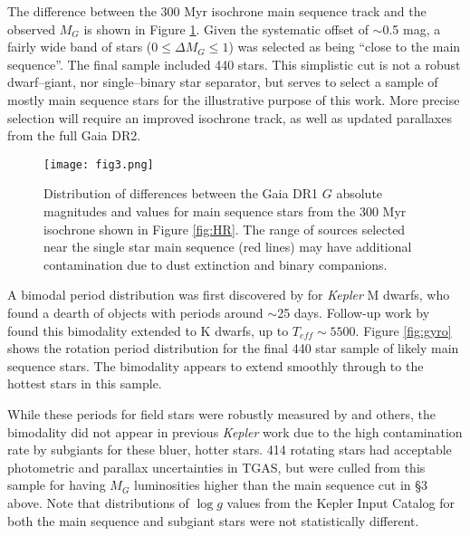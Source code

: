 \documentclass[manuscript, letterpaper]{aastex6}
\makeatletter
\let\origsection\section
\renewcommand\section{\@ifstar{\starsection}{\nostarsection}}
\newcommand\nostarsection[1]{\sectionprelude\origsection{#1}}
\newcommand\starsection[1]{\sectionprelude\origsection*{#1}}
\newcommand\sectionprelude{\vspace{1em}}
\newcommand{\Kepler}{\textsl{Kepler}\xspace}
\makeatother
\begin{document}
The difference between the 300 Myr isochrone main sequence track and the observed $M_G$ is shown in Figure \ref{fig:hist}. Given the systematic offset of $\sim$0.5 mag, a fairly wide band of stars ($0\le \Delta M_G \le 1$) was selected as being ``close to the main sequence''. The final sample included 440 stars. This simplistic cut is not a robust dwarf--giant, nor single--binary star separator, but serves to select a sample of mostly main sequence stars for the illustrative purpose of this work. More precise selection will require an improved isochrone track, as well as updated parallaxes from the full Gaia DR2.




\begin{figure}[]
\centering
\texttt{[image: fig3.png]}
\caption{Distribution of differences between the Gaia DR1 $G$ absolute magnitudes and values for main sequence stars from the 300 Myr isochrone shown in Figure \ref{fig:HR}. The range of sources selected near the single star main sequence (red lines) may have additional contamination due to dust extinction and binary companions.}
\label{fig:hist}
\end{figure}








\section{Extending the Spin-Down Gap}
A bimodal period distribution was first discovered by \citet{mcquillan2013} for \Kepler M dwarfs, who found a dearth of objects with periods around $\sim$25 days. Follow-up work by \citet{mcquillan2014} found this bimodality extended to K dwarfs, up to $T_{eff}\sim5500$. Figure \ref{fig:gyro} shows the rotation period distribution for the final 440 star sample of likely main sequence stars. The bimodality appears to extend smoothly through to the hottest stars in this sample. 

While these periods for field stars were robustly measured by \citet{mcquillan2014} and others, the bimodality did not appear in previous \Kepler work due to the high contamination rate by subgiants for these bluer, hotter stars.  414 rotating stars had acceptable photometric and parallax uncertainties in TGAS, but were culled from this sample for having $M_G$ luminosities higher than the main sequence cut in \S3 above. Note that distributions of $\log g$ values from the Kepler Input Catalog \citep{brown2011a} for both the main sequence and subgiant stars were not statistically different.
\end{document}
